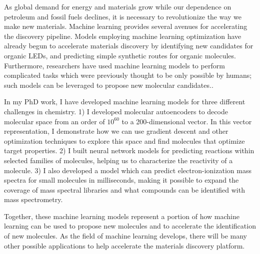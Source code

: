 
As global demand for energy and materials grow while our dependence on petroleum and fossil fuels declines, it is necessary to revolutionize the way we make new materials. 
Machine learning provides several avenues for accelerating the discovery pipeline.
Models employing machine learning optimization have already begun to accelerate materials discovery by identifying new candidates for organic LEDs, and predicting simple synthetic routes for organic molecules. 
Furthermore, researchers have used machine learning models to perform complicated tasks which were previously thought to be only possible by humans; such models can be leveraged to propose new molecular candidates.. 

In my PhD work, I have developed machine learning models for three different challenges in chemistry. 
1) I developed molecular autoencoders to decode molecular space from an order of $10^{60}$ to a 200-dimensional vector. In this vector representation, I demonstrate how we can use gradient descent and other optimization techniques to explore this space and find molecules that optimize target properties. 
2) I built neural network models for predicting reactions within selected families of molecules, helping us to characterize the reactivity of a molecule. 
3) I also developed a model which can predict electron-ionization mass spectra for small molecules in milliseconds, making it possible to expand the coverage of mass spectral libraries and what compounds can be identified with mass spectrometry. 

Together, these machine learning models represent a portion of how machine learning can be used to propose new molecules and to accelerate the identification of new molecules. As the field of machine learning develops, there will be many other possible applications to help accelerate the materials discovery platform.
